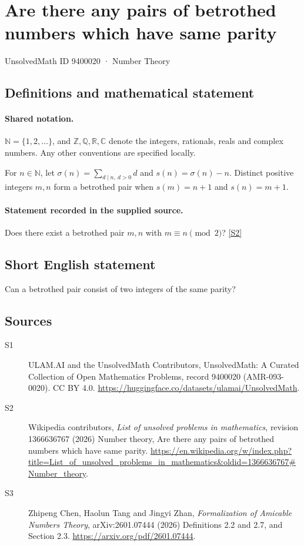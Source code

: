 \documentclass[11pt]{article}
\newcommand{\sref}[2]{\hyperlink{source:#1:#2}{[S#2]}}
\begin{document}
\setcounter{section}{9400019}
\section{Are there any pairs of betrothed numbers which have same parity}\label{9400020}
{\small\sffamily UnsolvedMath ID 9400020 · Number Theory}
\subsection{Definitions and mathematical statement}

\paragraph{Shared notation.}$\mathbb N=\{1,2,\ldots\}$, and $\mathbb Z,\mathbb Q,\mathbb R,\mathbb C$ denote the integers, rationals, reals and complex numbers. Any other conventions are specified locally.


For $n\in\mathbb N$, let $\sigma(n)=\sum_{d\mid n,\ d>0}d$ and $s(n)=\sigma(n)-n$. Distinct positive integers $m,n$ form a betrothed pair when $s(m)=n+1$ and $s(n)=m+1$.
\paragraph{Statement recorded in the supplied source.}
Does there exist a betrothed pair $m,n$ with $m\equiv n\pmod2$? \sref{9400020}{2}
\subsection{Short English statement}
Can a betrothed pair consist of two integers of the same parity?
\subsection{Sources}
\begin{description}
\item[\hypertarget{source:9400020:1}{S1}] ULAM.AI and the UnsolvedMath Contributors, UnsolvedMath: A Curated Collection of Open Mathematics Problems, record 9400020 (AMR-093-0020). CC BY 4.0. \url{https://huggingface.co/datasets/ulamai/UnsolvedMath}.
\item[\hypertarget{source:9400020:2}{S2}] Wikipedia contributors, \emph{List of unsolved problems in mathematics}, revision 1366636767 (2026) Number theory, Are there any pairs of betrothed numbers which have same parity. \url{https://en.wikipedia.org/w/index.php?title=List_of_unsolved_problems_in_mathematics&oldid=1366636767#Number_theory}.
\item[\hypertarget{source:9400020:3}{S3}] Zhipeng Chen, Haolun Tang and Jingyi Zhan, \emph{Formalization of Amicable Numbers Theory}, arXiv:2601.07444 (2026) Definitions 2.2 and 2.7, and Section 2.3. \url{https://arxiv.org/pdf/2601.07444}.
\end{description}
\label{end:9400020}
\end{document}

